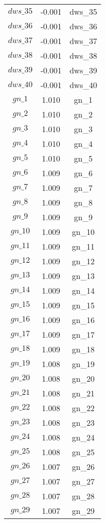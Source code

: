 \begin{center}
\begin{longtable}{ccc}
$dws\_35$ 	 & 	 -0.001 	 & 	 dws\_35\\
$dws\_36$ 	 & 	 -0.001 	 & 	 dws\_36\\
$dws\_37$ 	 & 	 -0.001 	 & 	 dws\_37\\
$dws\_38$ 	 & 	 -0.001 	 & 	 dws\_38\\
$dws\_39$ 	 & 	 -0.001 	 & 	 dws\_39\\
$dws\_40$ 	 & 	 -0.001 	 & 	 dws\_40\\
$gn\_1$ 	 & 	 1.010 	 & 	 gn\_1\\
$gn\_2$ 	 & 	 1.010 	 & 	 gn\_2\\
$gn\_3$ 	 & 	 1.010 	 & 	 gn\_3\\
$gn\_4$ 	 & 	 1.010 	 & 	 gn\_4\\
$gn\_5$ 	 & 	 1.010 	 & 	 gn\_5\\
$gn\_6$ 	 & 	 1.009 	 & 	 gn\_6\\
$gn\_7$ 	 & 	 1.009 	 & 	 gn\_7\\
$gn\_8$ 	 & 	 1.009 	 & 	 gn\_8\\
$gn\_9$ 	 & 	 1.009 	 & 	 gn\_9\\
$gn\_10$ 	 & 	 1.009 	 & 	 gn\_10\\
$gn\_11$ 	 & 	 1.009 	 & 	 gn\_11\\
$gn\_12$ 	 & 	 1.009 	 & 	 gn\_12\\
$gn\_13$ 	 & 	 1.009 	 & 	 gn\_13\\
$gn\_14$ 	 & 	 1.009 	 & 	 gn\_14\\
$gn\_15$ 	 & 	 1.009 	 & 	 gn\_15\\
$gn\_16$ 	 & 	 1.009 	 & 	 gn\_16\\
$gn\_17$ 	 & 	 1.009 	 & 	 gn\_17\\
$gn\_18$ 	 & 	 1.009 	 & 	 gn\_18\\
$gn\_19$ 	 & 	 1.008 	 & 	 gn\_19\\
$gn\_20$ 	 & 	 1.008 	 & 	 gn\_20\\
$gn\_21$ 	 & 	 1.008 	 & 	 gn\_21\\
$gn\_22$ 	 & 	 1.008 	 & 	 gn\_22\\
$gn\_23$ 	 & 	 1.008 	 & 	 gn\_23\\
$gn\_24$ 	 & 	 1.008 	 & 	 gn\_24\\
$gn\_25$ 	 & 	 1.008 	 & 	 gn\_25\\
$gn\_26$ 	 & 	 1.007 	 & 	 gn\_26\\
$gn\_27$ 	 & 	 1.007 	 & 	 gn\_27\\
$gn\_28$ 	 & 	 1.007 	 & 	 gn\_28\\
$gn\_29$ 	 & 	 1.007 	 & 	 gn\_29\\

\end{longtable}
\end{center}
